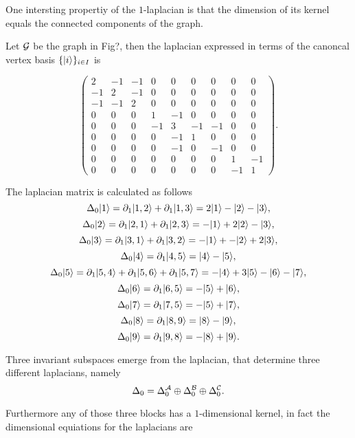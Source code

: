 \documentclass[../2.tex]{subfiles}
\begin{document}
    One intersting propertiy of the $1$-laplacian is that the dimension of its kernel equals the connected components of the graph.
    \begin{exa}
        Let $\mathcal{G}$ be the graph  in {\color{red}Fig?}, then the laplacian expressed in terms of the canoncal vertex basis $\{| i \rangle\}_{i \in I}$ is

        \[\begin{pmatrix}
                2 & -1 & -1 & 0 & 0 & 0 & 0 & 0 & 0 \\
                -1 & 2 & -1 & 0 & 0 & 0 & 0 & 0 & 0 \\
                -1 & -1 & 2 & 0 & 0 & 0 & 0 & 0 & 0 \\
                0 & 0 & 0 & 1 & -1 & 0 & 0 & 0 & 0 \\
                0 & 0 & 0 & -1 & 3 & -1 & -1 & 0 & 0 \\
                0 & 0 & 0 & 0 & -1 & 1 & 0 & 0 & 0 \\
                0 & 0 & 0 & 0 & -1 & 0 & -1 & 0 & 0 \\
                0 & 0 & 0 & 0 & 0 & 0 & 0 & 1 & -1 \\
                0 & 0 & 0 & 0 & 0 & 0 & 0 & -1 & 1 
            \end{pmatrix}. \] 

        The laplacian matrix is calculated as follows
        \[ \Delta_0 | 1 \rangle = \partial_1| 1,2 \rangle + \partial_1| 1,3 \rangle = 2| 1 \rangle-| 2 \rangle-| 3 \rangle,\]
        \[ \Delta_0 | 2 \rangle = \partial_1| 2,1 \rangle + \partial_1| 2,3 \rangle = -| 1 \rangle+2| 2 \rangle-| 3 \rangle,\]
        \[ \Delta_0 | 3 \rangle = \partial_1| 3,1 \rangle + \partial_1| 3,2 \rangle = -| 1 \rangle+-| 2 \rangle+2| 3 \rangle,\]
        \[ \Delta_0 | 4 \rangle = \partial_1| 4,5 \rangle = | 4 \rangle-| 5 \rangle,\]
        \[ \Delta_0 | 5 \rangle = \partial_1| 5,4 \rangle+\partial_1| 5,6 \rangle+\partial_1| 5,7 \rangle = -| 4 \rangle+3| 5 \rangle-| 6 \rangle-| 7 \rangle,\]
        \[ \Delta_0 | 6 \rangle = \partial_1| 6,5 \rangle = -| 5 \rangle+| 6 \rangle,\]
        \[ \Delta_0 | 7 \rangle = \partial_1| 7,5 \rangle = -| 5 \rangle+| 7 \rangle,\]
        \[ \Delta_0 | 8 \rangle = \partial_1| 8,9 \rangle = | 8 \rangle-| 9 \rangle,\]
        \[ \Delta_0 | 9 \rangle = \partial_1| 9,8 \rangle = -| 8 \rangle+| 9 \rangle.\] 

        Three invariant subspaces emerge from the laplacian, that determine three different laplacians, namely
        \[ \Delta_0 = \Delta_0^{\mathcal{A}} \oplus \Delta_0^{\mathcal{B}} \oplus \Delta_0^{\mathcal{C}}. \]

        Furthermore any of those three blocks has a $1$-dimensional kernel, in fact the dimensional equiations for the laplacians are


\end{exa}
\end{document}
